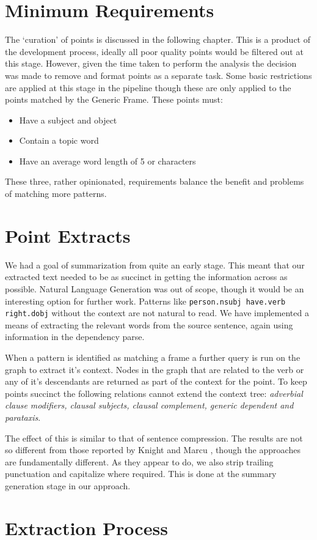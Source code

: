   \section{Minimum Requirements}
    The `curation' of points is discussed in the following chapter. This is a product of the development process, ideally all poor quality points would be filtered out at this stage. However, given the time taken to perform the analysis the decision was made to remove and format points as a separate task. Some basic restrictions are applied at this stage in the pipeline though these are only applied to the points matched by the Generic Frame. These points must:

    \begin{itemize}
      \item{Have a subject and object}
      \item{Contain a topic word}
      \item{Have an average word length of 5 or characters}
    \end{itemize}

    These three, rather opinionated, requirements balance the benefit and problems of matching more patterns.
  \section{Point Extracts}
    We had a goal of summarization from quite an early stage. This meant that our extracted text needed to be as succinct in getting the information across as possible. Natural Language Generation was out of scope, though it would be an interesting option for further work. Patterns like \texttt{person.nsubj have.verb right.dobj} without the context are not natural to read. We have implemented a means of extracting the relevant words from the source sentence, again using information in the dependency parse.

    When a pattern is identified as matching a frame a further query is run on the graph to extract it's context. Nodes in the graph that are related to the verb or any of it's descendants are returned as part of the context for the point. To keep points succinct the following relations cannot extend the context tree: \textit{adverbial clause modifiers, clausal subjects, clausal complement, generic dependent and parataxis}.

    The effect of this is similar to that of sentence compression. The results are not so different from those reported by Knight and Marcu \cite{knight2000statistics}, though the approaches are fundamentally different. As they appear to do, we also strip trailing punctuation and capitalize where required. This is done at the summary generation stage in our approach.

  \section{Extraction Process}
